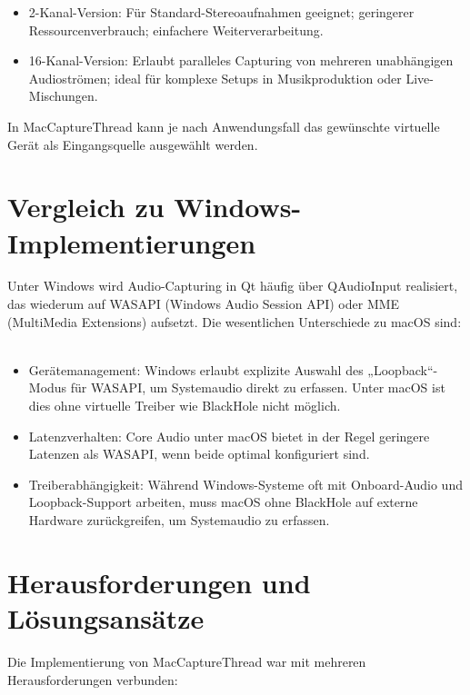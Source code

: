 \begin{itemize}
\item 2-Kanal-Version: Für Standard-Stereoaufnahmen geeignet; geringerer Ressourcenverbrauch; einfachere Weiterverarbeitung.

\item 16-Kanal-Version: Erlaubt paralleles Capturing von mehreren unabhängigen Audioströmen; ideal für komplexe Setups in Musikproduktion oder Live-Mischungen.
\end{itemize}

 In MacCaptureThread kann je nach Anwendungsfall das gewünschte virtuelle Gerät als Eingangsquelle ausgewählt werden.



\section{Vergleich zu Windows-Implementierungen}

Unter Windows wird Audio-Capturing in Qt häufig über QAudioInput realisiert, das wiederum auf WASAPI (Windows Audio Session API) oder MME (MultiMedia Extensions) aufsetzt.
Die wesentlichen Unterschiede zu macOS sind: \\\\

\begin{itemize}
\item Gerätemanagement: 
Windows erlaubt explizite Auswahl des „Loopback“-Modus für WASAPI, um Systemaudio direkt zu erfassen. Unter macOS ist dies ohne virtuelle Treiber wie BlackHole nicht möglich.
\item Latenzverhalten: 
Core Audio unter macOS bietet in der Regel geringere Latenzen als WASAPI, wenn beide optimal konfiguriert sind.
\item Treiberabhängigkeit: 
Während Windows-Systeme oft mit Onboard-Audio und Loopback-Support arbeiten, muss macOS ohne BlackHole auf externe Hardware zurückgreifen, um Systemaudio zu erfassen.
\cite{pohlmann2011}

\end{itemize}


\section{Herausforderungen und Lösungsansätze}

Die Implementierung von MacCaptureThread war mit mehreren Herausforderungen verbunden:

